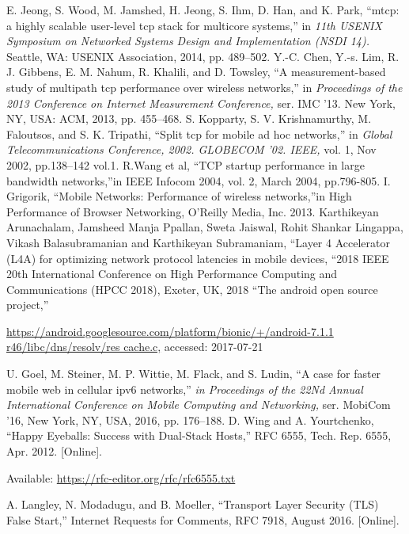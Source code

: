 \begin{multicols}{2}
\begin{thebibliography}{99}
 E. Jeong, S. Wood, M. Jamshed, H. Jeong, S. Ihm, D. Han, and K. Park, ``mtcp: a highly scalable user-level tcp stack for multicore systems,” in \textit{11th USENIX Symposium on Networked Systems Design and Implementation (NSDI 14).} Seattle, WA: USENIX Association, 2014, pp. 489–502.
 Y.-C. Chen, Y.-s. Lim, R. J. Gibbens, E. M. Nahum, R. Khalili, and D. Towsley, ``A measurement-based study of multipath tcp performance over wireless networks,” in \textit{Proceedings of the 2013 Conference on Internet Measurement Conference,} ser. IMC ’13. New York, NY, USA: ACM, 2013, pp. 455–468.
 S. Kopparty, S. V. Krishnamurthy, M. Faloutsos, and S. K. Tripathi, ``Split tcp for mobile ad hoc networks,” in \textit{Global Telecommunications Conference, 2002. GLOBECOM ’02. IEEE,} vol. 1, Nov 2002, pp.138–142 vol.1.
 R.Wang et al, ``TCP startup performance in large bandwidth networks,”in IEEE Infocom 2004, vol. 2, March 2004, pp.796-805.
 I. Grigorik, ``Mobile Networks: Performance of wireless networks,”in High Performance of Browser Networking, O’Reilly Media, Inc. 2013.
 Karthikeyan Arunachalam, Jamsheed Manja Ppallan, Sweta Jaiswal, Rohit Shankar Lingappa, Vikash Balasubramanian and Karthikeyan Subramaniam, “Layer 4 Accelerator (L4A) for optimizing network protocol latencies in mobile devices, “2018 IEEE 20th International Conference on High Performance Computing and Communications (HPCC 2018), Exeter, UK, 2018
 “The android open source project,”

 \url{https://android.googlesource.com/platform/bionic/+/android-7.1.1 r46/libc/dns/resolv/res cache.c,} accessed: 2017-07-21

 U. Goel, M. Steiner, M. P. Wittie, M. Flack, and S. Ludin, “A case for faster mobile web in cellular ipv6 networks,” \textit{in Proceedings of the 22Nd Annual International Conference on Mobile Computing and Networking,} ser. MobiCom ’16, New York, NY, USA, 2016, pp. 176–188.
 D. Wing and A. Yourtchenko, “Happy Eyeballs: Success with Dual-Stack Hosts,” RFC 6555, Tech. Rep. 6555, Apr. 2012. [Online]. 

Available: \url{https://rfc-editor.org/rfc/rfc6555.txt}

 A. Langley, N. Modadugu, and B. Moeller, “Transport Layer Security (TLS) False Start,” Internet Requests for Comments, RFC 7918, August 2016. [Online]. 


\end{thebibliography}
\end{multicols}

